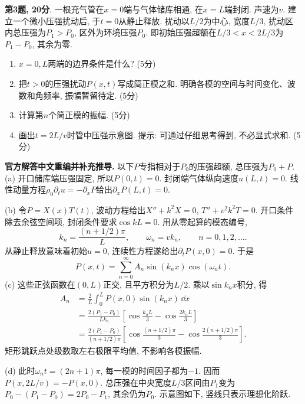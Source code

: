 \begin{exercise}
\textbf{第3题, 20分}. \label{exam:f2.3}
一根充气管在$x=0$端与气体储库相通, 在$x=L$端封闭. 声速为$v$. 建立一个微小压强扰动后, 于$t=0$从静止释放. 扰动以$L/2$为中心, 宽度$L/3$, 扰动区内总压强为$P_1>P_0$, 区外为环境压强$P_0$. 即初始压强超额在$L/3<x<2L/3$为$P_1-P_0$, 其余为零.
\begin{enumerate}[label=(\alph*)]
\item $x=0,L$两端的边界条件是什么? (5分)
\item 把$t>0$的压强扰动$P(x,t)$写成简正模之和. 明确各模的空间与时间变化、波数和角频率, 振幅暂留待定. (5分)
\item 计算第$n$个简正模的振幅. (5分)
\item 画出$t=2L/v$时管中压强示意图. 提示: 可通过仔细思考得到, 不必显式求和. (5分)
\end{enumerate}
\end{exercise}
\begin{solution}
\textbf{官方解答中文重编并补充推导.}
以下$P$专指相对于$P_0$的压强超额, 总压强为$P_0+P$.
(a) 开口储库端压强固定, 所以$P(0,t)=0$. 封闭端气体纵向速度$u(L,t)=0$. 线性动量方程$\rho_0\partial_tu=-\partial_xP$给出$\partial_xP(L,t)=0$.

(b) 令$P=X(x)T(t)$, 波动方程给出$X''+k^2X=0$, $T''+v^2k^2T=0$. 开口条件除去余弦空间项, 封闭条件要求$\cos kL=0$. 用从零起算的模态编号,
\[
k_n=\frac{(n+1/2)\pi}{L},\qquad \omega_n=vk_n,\qquad n=0,1,2,\ldots.
\]
从静止释放意味着初始$u=0$, 连续性方程遂给出$\partial_tP(x,0)=0$. 于是
\[
P(x,t)=\sum_{n=0}^{\infty}A_n\sin(k_nx)\cos(\omega_nt).
\]
(c) 这些正弦函数在$(0,L)$正交, 且平方积分为$L/2$. 乘以$\sin k_nx$积分, 得
\begin{align*}
A_n&=\frac2L\int_0^LP(x,0)\sin(k_nx)\,\dd x\\
&=\frac{2(P_1-P_0)}{Lk_n}\left[\cos\frac{k_nL}{3}-\cos\frac{2k_nL}{3}\right]\\
&=\frac{2(P_1-P_0)}{(n+1/2)\pi}
\left[\cos\frac{(n+1/2)\pi}{3}-\cos\frac{2(n+1/2)\pi}{3}\right].
\end{align*}
矩形跳跃点处级数取左右极限平均值, 不影响各模振幅.

(d) 此时$\omega_nt=(2n+1)\pi$, 每一模的时间因子都为$-1$. 因而$P(x,2L/v)=-P(x,0)$. 总压强在中央宽度$L/3$区间由$P_1$变为$P_0-(P_1-P_0)=2P_0-P_1$, 其余仍为$P_0$. 示意图如下, 竖线只表示理想化阶跃.
\begin{center}
\end{center}
\end{solution}


